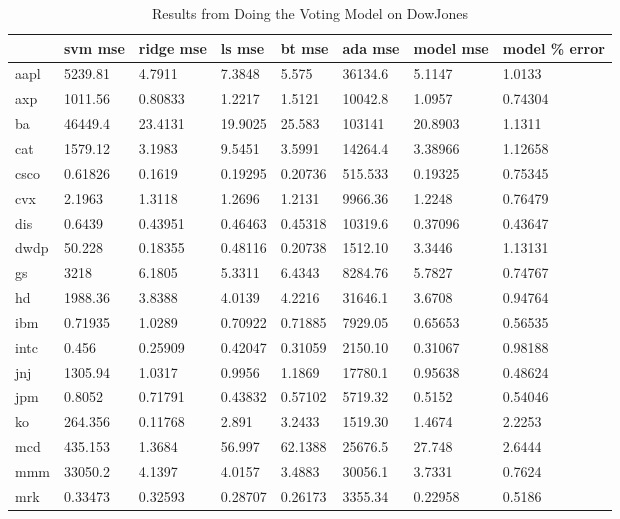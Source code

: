 \begin{table}[H]
 \centering
 \caption{Results from Doing the Voting Model on DowJones} 
\begin{tabularx}{0.5\textwidth}{| X | X | X | X | X | X | X | X |}

\hline
 &\textbf{svm mse} & \textbf{ridge mse} & \textbf{ls mse} & \textbf{bt mse} & \textbf{ada mse} & \textbf{model mse}	& \textbf{model \% error} \\ \hline
aapl & 5239.81 & 4.7911 & 7.3848 & 5.575 & 36134.6 & 5.1147 & 1.0133 \\ \hline
axp & 1011.56 & 0.80833 & 1.2217 & 1.5121 & 10042.8 & 1.0957	& 0.74304 \\ \hline
ba & 46449.4 & 23.4131 & 19.9025 & 25.583 & 103141 & 20.8903 & 1.1311 \\ \hline
cat	& 1579.12 & 3.1983 & 9.5451 & 3.5991 & 14264.4 & 3.38966 & 1.12658 \\ \hline
csco & 0.61826 & 0.1619 & 0.19295 & 0.20736 & 515.533 & 0.19325 & 0.75345 \\ \hline
cvx & 2.1963 & 1.3118 & 1.2696 & 1.2131 & 9966.36 & 1.2248 & 0.76479 \\ \hline
dis & 0.6439 & 0.43951 & 0.46463 & 0.45318 & 10319.6 & 0.37096 & 0.43647 \\ \hline
dwdp & 50.228 & 0.18355 & 0.48116 & 0.20738 & 1512.10 & 3.3446 & 1.13131 \\ \hline
gs & 3218 & 6.1805 & 5.3311 & 6.4343 & 8284.76 & 5.7827 & 0.74767 \\ \hline
hd & 1988.36 & 3.8388 & 4.0139 & 4.2216 & 31646.1 & 3.6708 & 0.94764 \\ \hline
ibm & 0.71935 & 1.0289 & 0.70922 & 0.71885 & 7929.05 & 0.65653 & 0.56535 \\ \hline
intc & 0.456 & 0.25909 & 0.42047 & 0.31059 & 2150.10 & 0.31067 & 0.98188 \\ \hline
jnj & 1305.94 & 1.0317 & 0.9956 & 1.1869 & 17780.1 & 0.95638 & 0.48624 \\ \hline
jpm & 0.8052 & 0.71791 & 0.43832 & 0.57102 & 5719.32 & 0.5152 & 0.54046 \\ \hline
ko & 264.356 & 0.11768 & 2.891 & 3.2433 & 1519.30 & 1.4674 & 2.2253 \\ \hline
mcd & 435.153 & 1.3684	& 56.997 & 62.1388 & 25676.5 & 27.748 & 2.6444 \\ \hline
mmm & 33050.2 & 4.1397 & 4.0157 & 3.4883 & 30056.1 & 3.7331 & 0.7624 \\ \hline
mrk & 0.33473 & 0.32593 & 0.28707 & 0.26173 & 3355.34 & 0.22958 & 0.5186 \\ \hline

\end{tabularx}
\end{table}
